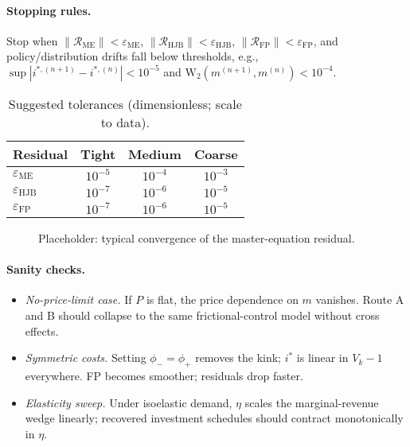 ﻿\documentclass[11pt,letterpaper,oneside]{article}
\numberwithin{equation}{section}
\newcommand{\1}{\mathbf{1}}
\begin{document}
\begin{tcolorbox}[didacticstyle]
\begin{itemize}[leftmargin=1.1em,itemsep=0.25em]
\paragraph{Stopping rules.}
Stop when $\|\mathcal{R}_{\mathrm{ME}}\|<\varepsilon_{\mathrm{ME}}$, $\|\mathcal{R}_{\mathrm{HJB}}\|<\varepsilon_{\mathrm{HJB}}$, $\|\mathcal{R}_{\mathrm{FP}}\|<\varepsilon_{\mathrm{FP}}$, and policy/distribution drifts fall below thresholds, e.g., $\sup|i^{*,(n+1)}-i^{*,(n)}|<10^{-5}$ and $\mathrm{W}_2(m^{(n+1)},m^{(n)})<10^{-4}$.

\begin{table}[ht]
\centering
\small
\begin{tabular}{@{}lccc@{}}
\toprule
Residual & Tight & Medium & Coarse \\
\midrule
$\varepsilon_{\mathrm{ME}}$ & $10^{-5}$ & $10^{-4}$ & $10^{-3}$ \\
$\varepsilon_{\mathrm{HJB}}$ & $10^{-7}$ & $10^{-6}$ & $10^{-5}$ \\
$\varepsilon_{\mathrm{FP}}$  & $10^{-7}$ & $10^{-6}$ & $10^{-5}$ \\
\bottomrule
\end{tabular}
\caption{Suggested tolerances (dimensionless; scale to data).}
\end{table}

\begin{figure}[ht]
\centering
{}
\caption{Placeholder: typical convergence of the master-equation residual.}
\end{figure}

\paragraph{Sanity checks.}
\begin{itemize}[leftmargin=1.25em]
\item \emph{No-price-limit case.} If $P$ is flat, the price dependence on $m$ vanishes. Route A and B should collapse to the same frictional-control model without cross effects.
\item \emph{Symmetric costs.} Setting $\phi_-=\phi_+$ removes the kink; $i^*$ is linear in $V_k-1$ everywhere. FP becomes smoother; residuals drop faster.
\item \emph{Elasticity sweep.} Under isoelastic demand, $\eta$ scales the marginal-revenue wedge linearly; recovered investment schedules should contract monotonically in $\eta$.
\end{itemize}


\end{itemize}
\end{tcolorbox}
\end{document}
